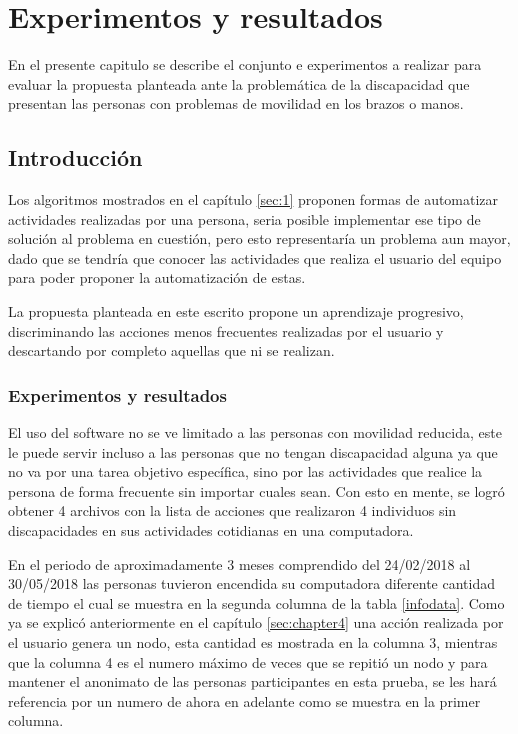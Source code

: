 \chapter{Experimentos y resultados}
\label{sec:chapter5}

En el presente capitulo se describe el conjunto e experimentos a realizar para evaluar la propuesta planteada ante la problem\'atica de la discapacidad que presentan las personas con problemas de movilidad en los brazos o manos.


\section{Introducci\'on}

Los algoritmos mostrados en el cap\'itulo \ref{sec:1} proponen formas de automatizar actividades realizadas por una persona, seria posible implementar ese tipo de soluci\'on al problema en cuesti\'on, pero esto representar\'ia un problema aun mayor, dado que se tendr\'ia que conocer las actividades que realiza el usuario del equipo para poder proponer la automatizaci\'on de estas. 


La propuesta planteada en este escrito propone un aprendizaje progresivo, discriminando las acciones menos frecuentes realizadas por el usuario y descartando por completo aquellas que ni se realizan. 


\subsection{Experimentos y resultados}

El uso del software no se ve limitado a las personas con movilidad reducida, este le puede servir incluso a las personas que no tengan discapacidad alguna ya que no va por una tarea objetivo espec\'ifica, sino por las actividades que realice la persona de forma frecuente sin importar cuales sean. Con esto en mente, se logr\'o obtener 4 archivos con la lista de acciones que realizaron 4 individuos sin discapacidades en sus actividades cotidianas en una computadora.


En el periodo de aproximadamente 3 meses comprendido del 24/02/2018 al 30/05/2018 las personas tuvieron encendida su computadora diferente cantidad de tiempo el cual se muestra en la segunda columna de la tabla \ref{infodata}. Como ya se explic\'o anteriormente en el cap\'itulo \ref{sec:chapter4} una acci\'on realizada por el usuario genera un nodo, esta cantidad es mostrada en la columna 3, mientras que la columna 4 es el numero m\'aximo de veces que se repiti\'o un nodo y para mantener el anonimato de las personas participantes en esta prueba, se les har\'a referencia por un numero de ahora en adelante como se muestra en la primer columna. 


